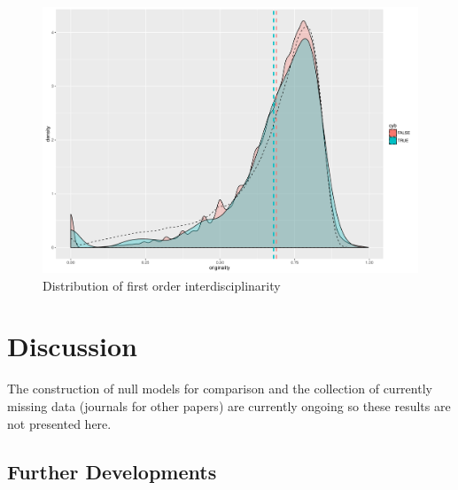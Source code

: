 \begin{figure}
\centering
\includegraphics[width=\textwidth]{figures/firstorderint_withNull}
\caption{Distribution of first order interdisciplinarity}
\label{fig:firstorderint}
\end{figure}













\section*{Discussion}
\label{sec:discussion}



The construction of null models for comparison and the collection of currently missing data (journals for other papers) are currently ongoing so these results are not presented here.




\subsection*{Further Developments}






